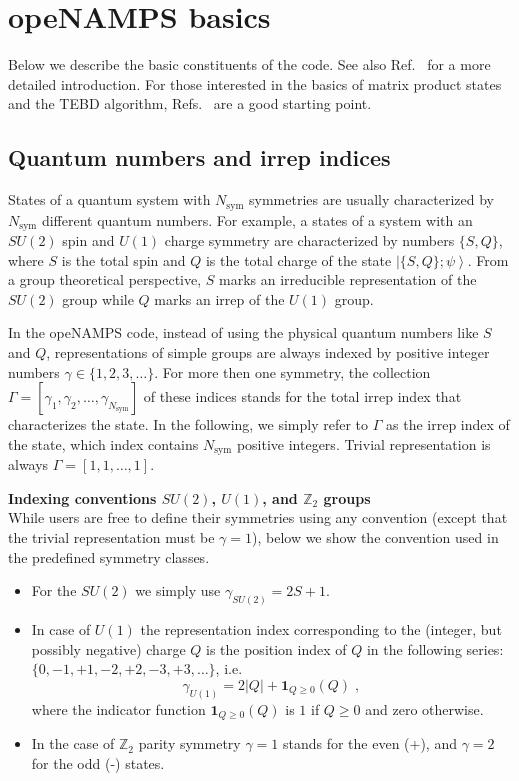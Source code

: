 \documentclass[aps,prb,twocolumn,showpacs,preprintnumbers,amsmath,amssymb, superscriptaddressm, nofootinbib]{revtex4-2}   %
\newcommand{\sym}{\mathrm{sym}}
\begin{document}
\section{opeNAMPS basics}
Below we describe the basic constituents of the code. See also Ref.~ for a more detailed introduction. For those interested in the basics of matrix product states and the TEBD algorithm, Refs.~ are a good starting point.

\subsection{Quantum numbers and irrep indices}
States of a quantum system with $N_\sym$ symmetries are usually characterized by $N_\sym$ different quantum numbers. For example, a states of a system with an $SU(2)$ spin and $U(1)$ charge symmetry are characterized by numbers $\lbrace S, Q \rbrace$, where $S$ is the total spin and $Q$ is the total charge of the state $\left| \lbrace S,Q \rbrace; \psi \right\rangle$. From a group theoretical perspective, $S$ marks an irreducible representation of the $SU(2)$ group while $Q$ marks an irrep of the $U(1)$ group. 

In the opeNAMPS code, instead of using the physical quantum numbers like $S$ and $Q$, representations of simple groups are always indexed by positive integer numbers $\gamma \in \lbrace 1,2,3,\dots \rbrace$. For more then one symmetry, the collection $\Gamma = \left[ \gamma_1, \gamma_2, \dots, \gamma_{N_\sym} \right]$ of these indices stands for the total irrep index that characterizes the state. In the following, we simply refer to $\Gamma$ as the irrep index of the state, which index contains $N_\sym$ positive integers. Trivial representation is always $\Gamma = [1,1,\dots,1]$.

\smallskip
\textbf{Indexing conventions $SU(2)$, $U(1)$, and $\mathbb{Z}_2$ groups} \\
While users are free to define their symmetries using any convention (except that the trivial representation must be $\gamma = 1$), below we show the convention used in the predefined symmetry classes.
\begin{itemize}
\item For the $SU(2)$ we simply use $\gamma_{SU(2)} = 2S + 1$.
\item In case of $U(1)$ the representation index corresponding to the (integer, but possibly negative) charge $Q$ is the position index of $Q$ in the following series: $\lbrace 0, -1, +1, -2, +2, -3, +3, \dots \rbrace$, i.e.
\begin{equation}
   \gamma_{U(1)} = 2 |Q| + \mathbf{1}_{Q \ge 0}(Q) \;,  
\end{equation}
where the indicator function $\mathbf{1}_{Q \ge 0}(Q)$ is $1$ if $Q \ge 0$ and zero otherwise.
\item In the case of $\mathbb{Z}_2$ parity symmetry $\gamma = 1$ stands for the even (+), and $\gamma=2$ for the odd (-) states.
\end{itemize}
\end{document}
